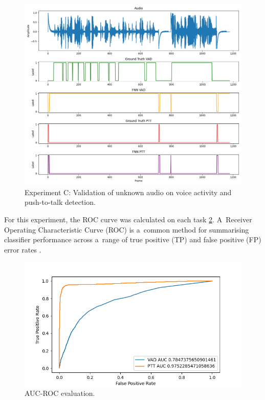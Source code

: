     \begin{figure}[ht!]
        \centering
        \includegraphics[width = \textwidth]{obrazky-figures/FNNOUTPUT_MTL.png}
        \caption{Experiment C: Validation of unknown audio on voice activity and push-to-talk detection.}
        \label{fig:validationFNNMLT}
    \end{figure}

    \newpage
    For this experiment, the ROC curve was calculated on each task \ref{fig:validationFNNMLTROC}. A~Receiver Operating Characteristic Curve (ROC) is a~common method for summarising classifier performance across a~range of true positive (TP) and false positive (FP) error rates \cite{swets1988}.
    
        
    \begin{figure}[ht!]
        \centering
        \includegraphics[width = \textwidth]{obrazky-figures/ROC.png}
        \caption{AUC-ROC evaluation.}
        \label{fig:validationFNNMLTROC}
    \end{figure}

